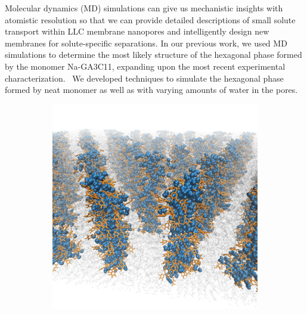 \documentclass[journal=jpcbfk,manuscript=article]{achemso}
\begin{document}
  Molecular dynamics (MD) simulations can give us mechanistic insights with 
  atomistic resolution so that we can provide detailed descriptions of
  small solute transport within LLC membrane nanopores and intelligently design new membranes for 
  solute-specific separations. In our previous work, we used MD simulations to 
  determine the most likely structure of the hexagonal phase formed by the monomer
  Na-GA3C11, expanding upon the most recent experimental characterization.~\cite{coscia_understanding_2018,feng_thin_2016}
  We developed techniques to simulate the hexagonal phase formed by neat 
  monomer as well as with varying amounts of water in the pores.
  
  \begin{figure}
  \centering
  \begin{subfigure}{0.45\textwidth}
  \includegraphics[width=\textwidth]{ortho_view.pdf}
  \caption{}
  \end{subfigure}
  \begin{subfigure}{0.45\textwidth}

\end{subfigure}
\end{figure}
\end{document}
